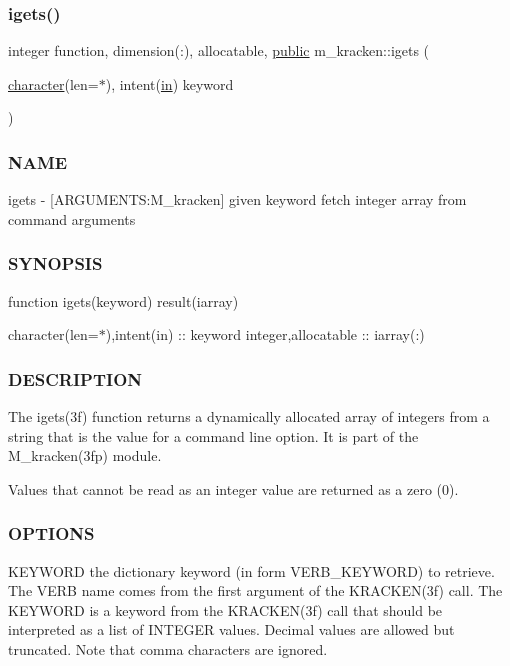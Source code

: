 \subsubsection{\texorpdfstring{igets()}{igets()}}
{\footnotesize\ttfamily integer function, dimension(\+:), allocatable, \hyperlink{M__stopwatch_83_8txt_a2f74811300c361e53b430611a7d1769f}{public} m\+\_\+kracken\+::igets (\begin{DoxyParamCaption}\item[{\hyperlink{option__stopwatch_83_8txt_abd4b21fbbd175834027b5224bfe97e66}{character}(len=$\ast$), intent(\hyperlink{M__journal_83_8txt_afce72651d1eed785a2132bee863b2f38}{in})}]{keyword }\end{DoxyParamCaption})}



\subsubsection*{N\+A\+ME}

igets -\/ \mbox{[}A\+R\+G\+U\+M\+E\+N\+TS\+:M\+\_\+kracken\mbox{]} given keyword fetch integer array from command arguments \subsubsection*{S\+Y\+N\+O\+P\+S\+IS}

function igets(keyword) result(iarray)

character(len=$\ast$),intent(in) \+:\+: keyword integer,allocatable \+:\+: iarray(\+:) \subsubsection*{D\+E\+S\+C\+R\+I\+P\+T\+I\+ON}

The igets(3f) function returns a dynamically allocated array of integers from a string that is the value for a command line option. It is part of the M\+\_\+kracken(3fp) module.

Values that cannot be read as an integer value are returned as a zero (0).

\subsubsection*{O\+P\+T\+I\+O\+NS}

K\+E\+Y\+W\+O\+RD the dictionary keyword (in form V\+E\+R\+B\+\_\+\+K\+E\+Y\+W\+O\+RD) to retrieve. The V\+E\+RB name comes from the first argument of the K\+R\+A\+C\+K\+E\+N(3f) call. The K\+E\+Y\+W\+O\+RD is a keyword from the K\+R\+A\+C\+K\+E\+N(3f) call that should be interpreted as a list of I\+N\+T\+E\+G\+ER values. Decimal values are allowed but truncated. Note that comma characters are ignored.

